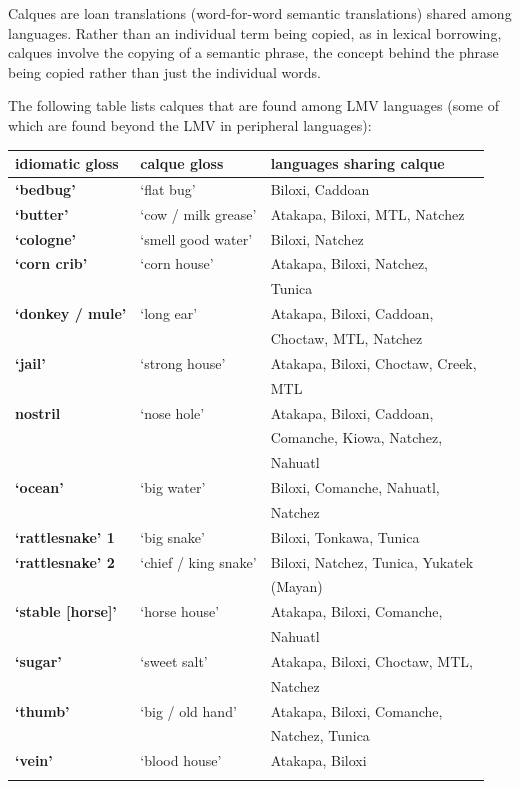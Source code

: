 \documentclass[output=paper]{LSP/langsci}
\begin{document}
Calques are loan translations (word-for-word semantic translations) shared among languages. Rather than an individual term being copied, as in lexical borrowing, calques involve the copying of a semantic phrase, the concept behind the phrase being copied rather than just the individual words.

The following table lists calques that are found among LMV languages (some of which are found beyond the LMV in peripheral languages): 

\ea
{\hspace{1em}}\newline
\begin{tabular}{ lll }
\hhline{===} idiomatic gloss & calque gloss & languages sharing calque
\\ \hline \textbf{`bedbug'} & `flat bug' & Biloxi, Caddoan
\\ \textbf{`butter'} & `cow / milk grease' & Atakapa, Biloxi, MTL, Natchez 
\\ \textbf{`cologne'} & `smell good water' & Biloxi, Natchez
\\ \textbf{`corn crib'} & `corn house' & Atakapa, Biloxi, Natchez, 
\\ & & Tunica 
\\ \textbf{`donkey / mule'} & `long ear' & Atakapa, Biloxi, Caddoan,  
\\ & & Choctaw, MTL, Natchez
\\ \textbf{`jail'} & `strong house' & Atakapa, Biloxi, Choctaw, Creek,  
\\ & & MTL 
\\ \textbf{nostril} & `nose hole' & Atakapa, Biloxi, Caddoan, 
\\ & & Comanche, Kiowa, Natchez, 
\\ & & Nahuatl
\\ \textbf{`ocean'} & `big water' & Biloxi, Comanche, Nahuatl, 
\\ & & Natchez 
\\ \textbf{`rattlesnake' 1} & `big snake' & Biloxi, Tonkawa, Tunica 
\\ \textbf{`rattlesnake' 2} & `chief / king snake' & Biloxi, Natchez, Tunica, Yukatek 
\\ & & (Mayan)
\\ \textbf{`stable [horse]'} & `horse house' & Atakapa, Biloxi, Comanche, 
\\ & & Nahuatl
\\ \textbf{`sugar'} & `sweet salt' & Atakapa, Biloxi, Choctaw, MTL, 
\\ & & Natchez 
\\ \textbf{`thumb'} & `big / old hand' & Atakapa, Biloxi, Comanche,  
\\ & & Natchez, Tunica 
\\ \textbf{`vein'} & `blood house' & Atakapa, Biloxi 
\\ \hhline{===}
\end{tabular}\z
\end{document}
